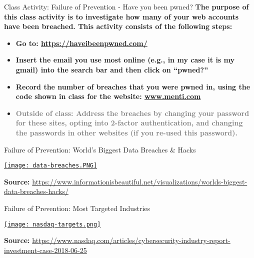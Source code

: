 \documentclass[aspectratio=169]{beamer} %
\begin{document}
\begin{frame}{Class Activity: Failure of Prevention - Have you been pwned?}
	\textbf{The purpose of this class activity is to investigate how many of your web accounts have been breached. This activity consists of the following steps:}
	
	\begin{itemize}
		\item \textbf{Go to: \textcolor{miamired}{\url{https://haveibeenpwned.com/}}}
		
		\item \textbf{Insert the email you use most online (e.g., in my case it is my gmail) into the search bar and then click on ``pwned?''}
		
		\item \textbf{Record the number of breaches that you were pwned in, using the code shown in class for the website: \textcolor{miamired}{\url{www.menti.com}}}
		
		\item \textbf{\textcolor{gray}{Outside of class: Address the breaches by changing your password for these sites, opting into 2-factor authentication, and changing the passwords in other websites (if you re-used this password).}}
	\end{itemize}
\end{frame}

\begin{frame}{Failure of Prevention: World's Biggest Data Breaches \& Hacks}
	\centering
	
	\href{https://www.informationisbeautiful.net/visualizations/worlds-biggest-data-breaches-hacks/}{\texttt{[image: data-breaches.PNG]}}
	
		\EndofPage
	
	\centering \scriptsize{\textbf{Source:} \url{https://www.informationisbeautiful.net/visualizations/worlds-biggest-data-breaches-hacks/}}
	
	\vspace{0.5\baselineskip}
\end{frame}

\begin{frame}{Failure of Prevention: Most Targeted Industries}
	\centering
	
	\href{https://www.nasdaq.com/articles/cybersecurity-industry-report-investment-case-2018-06-25}{\texttt{[image: nasdaq-targets.png]}}
	
	\EndofPage
	
	\centering \scriptsize{\textbf{Source:} \url{https://www.nasdaq.com/articles/cybersecurity-industry-report-investment-case-2018-06-25}}
	
	\vspace{0.5\baselineskip}
\end{frame}
\end{document}
